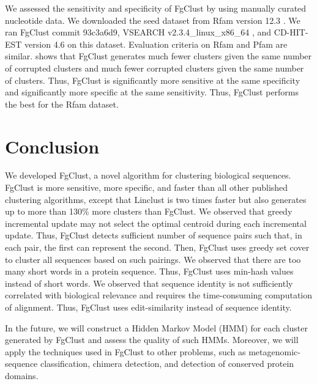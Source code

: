 \documentclass[11pt,letterpaper]{article}
\begin{document}
We assessed the sensitivity and specificity of FgClust by using manually curated nucleotide data. 
We downloaded the seed dataset from Rfam version 12.3 \citep{nawrocki2014rfam}.
We ran FgClust commit 93c3a6d9, VSEARCH v2.3.4\_linux\_x86\_64 \citep{rognes2016vsearch}, and CD-HIT-EST version 4.6 \citep{fu2012cd} on this dataset.
Evaluation criteria on Rfam and Pfam are similar.
 shows that FgClust generates much fewer clusters given the same number of corrupted clusters and much fewer corrupted clusters given the same number of clusters.
Thus, FgClust is significantly more sensitive at the same specificity and significantly more specific at the same sensitivity.
Thus, FgClust performs the best for the Rfam dataset.

\section{Conclusion}

We developed FgClust, a novel algorithm for clustering biological sequences.
FgClust is more sensitive, more specific, and faster than all other published clustering algorithms, except that Linclust is two times faster but also generates up to more than 130\% more clusters than FgClust.
We observed that greedy incremental update may not select the optimal centroid during each incremental update.
Thus, FgClust detects sufficient number of sequence pairs such that, in each pair, the first can represent the second.
Then, FgClust uses greedy set cover to cluster all sequences based on such pairings.
We observed that there are too many short words in a protein sequence.
Thus, FgClust uses min-hash values instead of short words.
We observed that sequence identity is not sufficiently correlated with biological relevance and requires the time-consuming computation of alignment.
Thus, FgClust uses edit-similarity instead of sequence identity.

In the future, we will construct a Hidden Markov Model (HMM) for each cluster generated by FgClust and assess the quality of such HMMs.
Moreover, we will apply the techniques used in FgClust to other problems, such as metagenomic-sequence classification, chimera detection, and detection of conserved protein domains.



%

\end{document}

